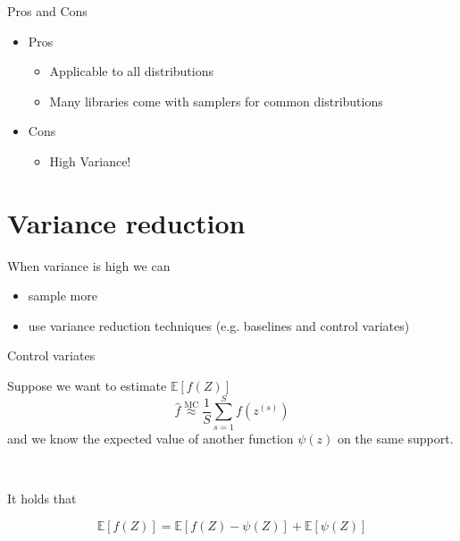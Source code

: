 \begin{frame}{Pros and Cons}
\begin{itemize}
\item Pros
\begin{itemize}
\item Applicable to all distributions
\item Many libraries come with samplers for common distributions
\end{itemize}
\pause
\item Cons
\begin{itemize}
\item High Variance!
\end{itemize}
\end{itemize}
\end{frame}

\section{Variance reduction}
\frame{\tableofcontents[currentsection]}

\begin{frame}{When variance is high we can}

\pause

\begin{itemize}
	\item sample more \\ \pause
	\item use variance reduction techniques (e.g. baselines and control variates)\\ 
\end{itemize}
\end{frame}



\begin{frame}{Control variates}

Suppose we want to estimate $\mathbb E[f(Z)]$ 
\begin{equation*}
\hat f \overset{\text{MC}}{\approx} \frac{1}{S} \sum_{s=1}^S f(z^{(s)})
\end{equation*}
and we know the expected value of another function $\psi(z)$ on the same support. \pause

~

It holds that 

\begin{equation*}
\mathbb E[f(Z)] = \mathbb E[f(Z) - \psi(Z)] + \mathbb E[\psi(Z)]
\end{equation*}



\end{frame}

